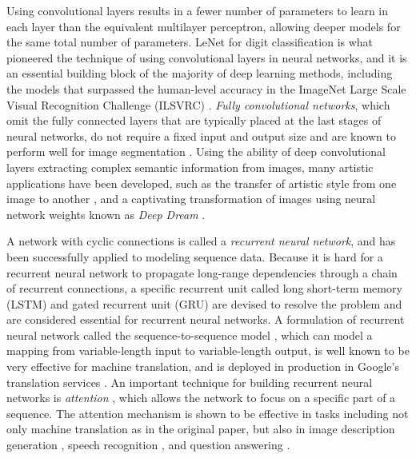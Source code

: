 Using convolutional layers results in a fewer number of parameters to learn in each layer than the equivalent multilayer perceptron, allowing deeper models for the same total number of parameters.
LeNet \cite{lecun1995lenet} for digit classification is what pioneered the technique of using convolutional layers in neural networks, and it is an essential building block of the majority of deep learning methods, including the models that surpassed the human-level accuracy in the ImageNet Large Scale Visual Recognition Challenge (ILSVRC) \cite{krizhevsky2012imagenet, simonyan2014vgg, szegedy2015googlenet, he2016resnet}.
\emph{Fully convolutional networks}, which omit the fully connected layers that are typically placed at the last stages of neural networks, do not require a fixed input and output size and are known to perform well for image segmentation \cite{shelhamer2017fcn}.
Using the ability of deep convolutional layers extracting complex semantic information from images, many artistic applications have been developed, such as the transfer of artistic style from one image to another \cite{gatys2015style}, and a captivating transformation of images using neural network weights known as \emph{Deep Dream} \cite{mahendran2016deepdream}.


A network with cyclic connections is called a \emph{recurrent neural network}, and has been successfully applied to modeling sequence data.
Because it is hard for a recurrent neural network to propagate long-range dependencies through a chain of recurrent connections, a specific recurrent unit called long short-term memory (LSTM) \cite{hochreiter1997lstm} and gated recurrent unit (GRU) \cite{cho2014seq2seq} are devised to resolve the problem and are considered essential for recurrent neural networks.
A formulation of recurrent neural network called the sequence-to-sequence model \cite{cho2014seq2seq,sutskever2014seq2seq}, which can model a mapping from variable-length input to variable-length output, is well known to be very effective for machine translation, and is deployed in production in Google's translation services \cite{wu2016google}.
An important technique for building recurrent neural networks is \emph{attention} \cite{bahdanau2014attention}, which allows the network to focus on a specific part of a sequence.
The attention mechanism is shown to be effective in tasks including not only machine translation as in the original paper, but also in image description generation \cite{karpathy2017desc}, speech recognition \cite{chorowski2015speech}, and question answering \cite{sukhbaatar2015memory}.

